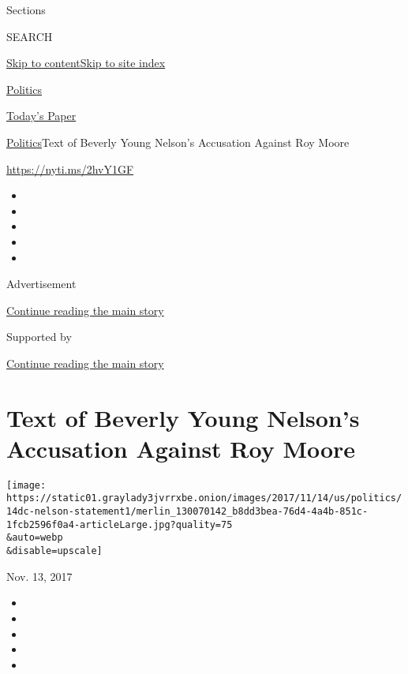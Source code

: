 Sections

SEARCH

\protect\hyperlink{site-content}{Skip to
content}\protect\hyperlink{site-index}{Skip to site index}

\href{https://www.nytimes3xbfgragh.onion/section/politics}{Politics}

\href{https://myaccount.nytimes3xbfgragh.onion/auth/login?response_type=cookie\&client_id=vi}{}

\href{https://www.nytimes3xbfgragh.onion/section/todayspaper}{Today's
Paper}

\href{/section/politics}{Politics}\textbar{}Text of Beverly Young
Nelson's Accusation Against Roy Moore

\url{https://nyti.ms/2hvY1GF}

\begin{itemize}
\item
\item
\item
\item
\item
\end{itemize}

Advertisement

\protect\hyperlink{after-top}{Continue reading the main story}

Supported by

\protect\hyperlink{after-sponsor}{Continue reading the main story}

\hypertarget{text-of-beverly-young-nelsons-accusation-against-roy-moore}{%
\section{Text of Beverly Young Nelson's Accusation Against Roy
Moore}\label{text-of-beverly-young-nelsons-accusation-against-roy-moore}}

\texttt{[image: https://static01.graylady3jvrrxbe.onion/images/2017/11/14/us/politics/14dc-nelson-statement1/merlin\_130070142\_b8dd3bea-76d4-4a4b-851c-1fcb2596f0a4-articleLarge.jpg?quality=75\\\&auto=webp\\\&disable=upscale]}

Nov. 13, 2017

\begin{itemize}
\item
\item
\item
\item
\item
\end{itemize}

